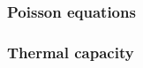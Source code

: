 \documentclass{subfiles}
\begin{document}
        \subsubsection*{Poisson equations}

        \subsubsection*{Thermal capacity}


\end{document}
